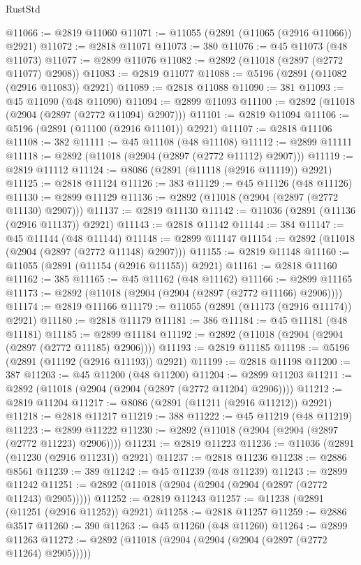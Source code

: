 \begin{lexlean}{RustStd}
\begin{coremodule}
@11066 := @2819 @11060
@11071 := @11055 (@2891 (@11065 (@2916 @11066)) @2921)
@11072 := @2818 @11071
@11073 := 380
@11076 := @45 @11073 (@48 @11073)
@11077 := @2899 @11076
@11082 := @2892 (@11018 (@2897 (@2772 @11077) @2908))
@11083 := @2819 @11077
@11088 := @5196 (@2891 (@11082 (@2916 @11083)) @2921)
@11089 := @2818 @11088
@11090 := 381
@11093 := @45 @11090 (@48 @11090)
@11094 := @2899 @11093
@11100 := @2892 (@11018 (@2904 (@2897 (@2772 @11094) @2907)))
@11101 := @2819 @11094
@11106 := @5196 (@2891 (@11100 (@2916 @11101)) @2921)
@11107 := @2818 @11106
@11108 := 382
@11111 := @45 @11108 (@48 @11108)
@11112 := @2899 @11111
@11118 := @2892 (@11018 (@2904 (@2897 (@2772 @11112) @2907)))
@11119 := @2819 @11112
@11124 := @8086 (@2891 (@11118 (@2916 @11119)) @2921)
@11125 := @2818 @11124
@11126 := 383
@11129 := @45 @11126 (@48 @11126)
@11130 := @2899 @11129
@11136 := @2892 (@11018 (@2904 (@2897 (@2772 @11130) @2907)))
@11137 := @2819 @11130
@11142 := @11036 (@2891 (@11136 (@2916 @11137)) @2921)
@11143 := @2818 @11142
@11144 := 384
@11147 := @45 @11144 (@48 @11144)
@11148 := @2899 @11147
@11154 := @2892 (@11018 (@2904 (@2897 (@2772 @11148) @2907)))
@11155 := @2819 @11148
@11160 := @11055 (@2891 (@11154 (@2916 @11155)) @2921)
@11161 := @2818 @11160
@11162 := 385
@11165 := @45 @11162 (@48 @11162)
@11166 := @2899 @11165
@11173 := @2892 (@11018 (@2904 (@2904 (@2897 (@2772 @11166) @2906))))
@11174 := @2819 @11166
@11179 := @11055 (@2891 (@11173 (@2916 @11174)) @2921)
@11180 := @2818 @11179
@11181 := 386
@11184 := @45 @11181 (@48 @11181)
@11185 := @2899 @11184
@11192 := @2892 (@11018 (@2904 (@2904 (@2897 (@2772 @11185) @2906))))
@11193 := @2819 @11185
@11198 := @5196 (@2891 (@11192 (@2916 @11193)) @2921)
@11199 := @2818 @11198
@11200 := 387
@11203 := @45 @11200 (@48 @11200)
@11204 := @2899 @11203
@11211 := @2892 (@11018 (@2904 (@2904 (@2897 (@2772 @11204) @2906))))
@11212 := @2819 @11204
@11217 := @8086 (@2891 (@11211 (@2916 @11212)) @2921)
@11218 := @2818 @11217
@11219 := 388
@11222 := @45 @11219 (@48 @11219)
@11223 := @2899 @11222
@11230 := @2892 (@11018 (@2904 (@2904 (@2897 (@2772 @11223) @2906))))
@11231 := @2819 @11223
@11236 := @11036 (@2891 (@11230 (@2916 @11231)) @2921)
@11237 := @2818 @11236
@11238 := @2886 @8561
@11239 := 389
@11242 := @45 @11239 (@48 @11239)
@11243 := @2899 @11242
@11251 := @2892 (@11018 (@2904 (@2904 (@2904 (@2897 (@2772 @11243) @2905)))))
@11252 := @2819 @11243
@11257 := @11238 (@2891 (@11251 (@2916 @11252)) @2921)
@11258 := @2818 @11257
@11259 := @2886 @3517
@11260 := 390
@11263 := @45 @11260 (@48 @11260)
@11264 := @2899 @11263
@11272 := @2892 (@11018 (@2904 (@2904 (@2904 (@2897 (@2772 @11264) @2905)))))

\end{coremodule}
\end{lexlean}
